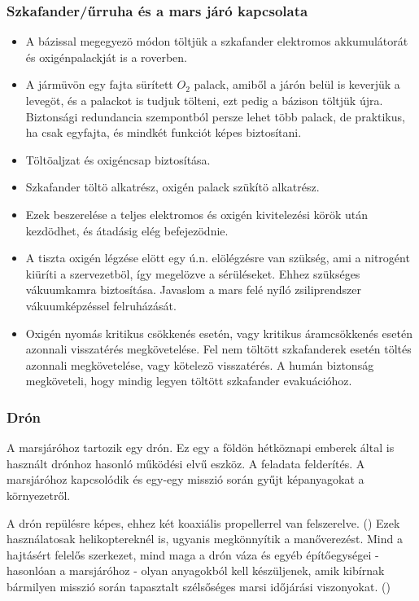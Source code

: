 \documentclass[12pt]{report}
\begin{document}
\subsubsection{Szkafander/űrruha és a mars járó kapcsolata}
\begin{itemize}

  \item {} A bázissal megegyezö módon töltjük a szkafander elektromos akkumulátorát és oxigénpalackját is a roverben.
  \item {} A jármüvön egy fajta sürített \(O_2\) palack, amiből a járón belül is keverjük a levegöt, és a palackot is tudjuk tölteni, ezt pedig a bázison töltjük újra. Biztonsági redundancia szempontból persze lehet több palack, de praktikus, ha csak egyfajta, és mindkét funkciót képes biztosítani.
  \item {} Töltöaljzat és oxigéncsap biztosítása.
  \item {} Szkafander töltö alkatrész, oxigén palack szükítö alkatrész.
  \item Ezek beszerelése a teljes elektromos és oxigén kivitelezési körök után kezdödhet, és átadásig elég befejezödnie.
  \item {} A tiszta oxigén légzése elött egy ú.n. elölégzésre van szükség, ami a nitrogént kiüríti a szervezetböl, így megelözve a sérüléseket. Ehhez szükséges vákuumkamra biztosítása. Javaslom a mars felé nyíló zsiliprendszer vákuumképzéssel felruházását.
  \item {} Oxigén nyomás kritikus csökkenés esetén, vagy kritikus áramcsökkenés esetén azonnali visszatérés megkövetelése. Fel nem töltött szkafanderek esetén töltés azonnali megkövetelése, vagy kötelezö visszatérés. A humán biztonság megköveteli, hogy mindig legyen töltött szkafander evakuációhoz.
\end{itemize}

\subsubsection{Drón}

A marsjáróhoz tartozik egy drón. Ez egy a földön hétköznapi emberek által is használt drónhoz hasonló működési elvű eszköz. A feladata felderítés. A marsjáróhoz kapcsolódik és egy-egy misszió során gyűjt képanyagokat a környezetről.

A drón repülésre képes, ehhez két koaxiális propellerrel van felszerelve. () Ezek használatosak helikoptereknél is, ugyanis megkönnyítik a manőverezést. Mind a hajtásért felelős szerkezet, mind maga a drón váza és egyéb építőegységei - hasonlóan a marsjáróhoz - olyan anyagokból kell készüljenek, amik kibírnak bármilyen misszió során tapasztalt szélsőséges marsi időjárási viszonyokat. ()\\
\end{document}
